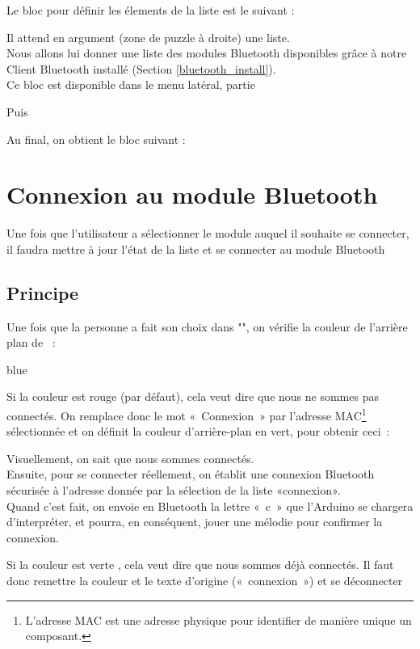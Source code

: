 Le bloc pour définir les élements de la liste  est le suivant : 


Il attend en argument (zone de puzzle à droite) une liste. \\
Nous allons lui donner une liste des modules Bluetooth disponibles grâce à notre Client Bluetooth installé (Section \ref{bluetooth_install}). \\

Ce bloc est disponible dans le menu latéral, partie 


Puis


Au final, on obtient le bloc suivant : 


\section{Connexion au module Bluetooth}

Une fois que l'utilisateur a sélectionner le module auquel il souhaite se connecter, il faudra mettre à jour l'état de la liste et se connecter au module Bluetooth

\subsection{Principe}
Une fois que la personne a fait son choix dans "", on vérifie la couleur de l'arrière plan de  :

\begin{items}{blue}{\Triangle}
    \item Si la couleur est rouge (par défaut), cela veut dire que nous ne sommes pas connectés.
    On remplace donc le mot « Connexion » par l'adresse MAC\footnote{L'adresse MAC est une adresse physique pour identifier de manière unique un composant.} sélectionnée et on définit la couleur d'arrière-plan en vert, pour obtenir ceci :
    
    
    
Visuellement, on sait que nous sommes connectés. \\
Ensuite,  pour se connecter réellement, on établit une connexion Bluetooth sécurisée à l'adresse donnée par la sélection de la liste «connexion». \\
Quand c'est fait, on envoie en Bluetooth la lettre « c » que l'Arduino se chargera d'interpréter, et pourra, en conséquent, jouer une mélodie pour confirmer la connexion.
    
   
    \item Si la couleur est verte , cela veut dire que nous sommes déjà connectés. Il faut donc remettre la couleur et le texte d'origine (« connexion ») et se déconnecter
    
\end{items}

